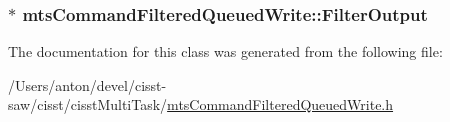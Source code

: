 \subsubsection[{Filter\+Output}]{$\ast$ mts\+Command\+Filtered\+Queued\+Write\+::\+Filter\+Output\hspace{0.3cm}{\ttfamily [protected]}}\label{classmts_command_filtered_queued_write_a485105f94a78b6a6ef600c3dbf9140d0}


The documentation for this class was generated from the following file\+:\begin{DoxyCompactItemize}
\item 
/\+Users/anton/devel/cisst-\/saw/cisst/cisst\+Multi\+Task/\hyperlink{mts_command_filtered_queued_write_8h}{mts\+Command\+Filtered\+Queued\+Write.\+h}\end{DoxyCompactItemize}
